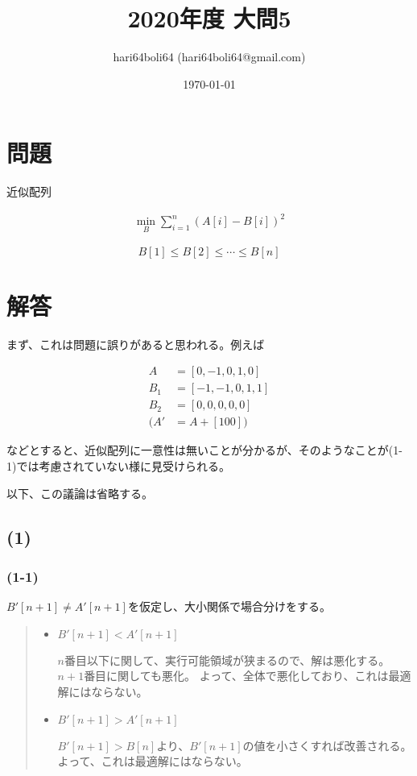 \documentclass[a4paper, 10pt, dvipdfmx]{jlreq}
\begin{document}
\title{2020年度 大問5}
\author{hari64boli64 (hari64boli64@gmail.com)}
\date{\today}
\maketitle


\section{問題}

近似配列

\begin{align*}
    \min_{B} \sum_{i=1}^{n}{(A[i]-B[i])^2}
\end{align*}

$$
    B[1]\leq B[2] \leq \cdots \leq B[n]
$$

\section{解答}

まず、これは問題に誤りがあると思われる。例えば

\begin{align*}
    A   & =[0,-1,0,1,0]  \\
    B_1 & =[-1,-1,0,1,1] \\
    B_2 & =[0,0,0,0,0]   \\
    (A' & =A+[100])
\end{align*}

などとすると、近似配列に一意性は無いことが分かるが、そのようなことが(1-1)では考慮されていない様に見受けられる。

以下、この議論は省略する。

\subsection*{(1)}

\subsubsection*{(1-1)}

$B'[n+1] \neq A'[n+1]$を仮定し、大小関係で場合分けをする。

\begin{quote}
    \begin{itemize}
        \item  $B'[n+1] < A'[n+1]$

              $n$番目以下に関して、実行可能領域が狭まるので、解は悪化する。
              $n+1$番目に関しても悪化。
              よって、全体で悪化しており、これは最適解にはならない。

        \item  $B'[n+1] > A'[n+1]$

              $B'[n+1]>B[n]$より、$B'[n+1]$の値を小さくすれば改善される。
              よって、これは最適解にはならない。
    \end{itemize}
\end{quote}
\end{document}
